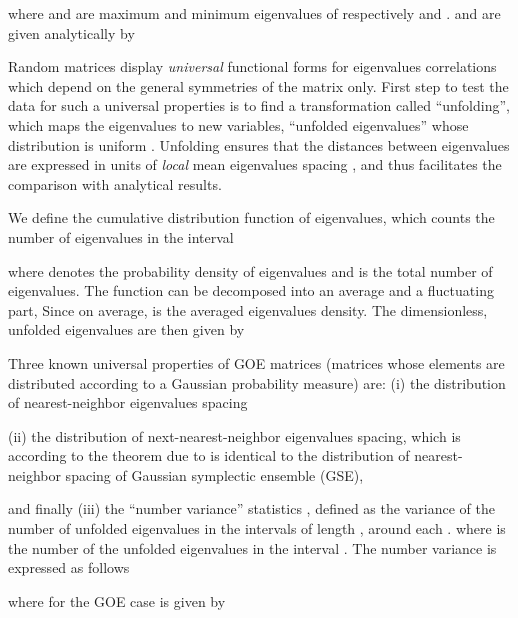 \documentclass{IEEEtran}
\begin{document}
where  and  are maximum and minimum eigenvalues
of  respectively and .
 and are given analytically by


Random matrices display \emph{universal} functional forms for eigenvalues
correlations which depend on the general symmetries of the matrix
only. First step to test the data for such a universal properties
is to find a transformation called {}``unfolding'', which maps the
eigenvalues  to new variables, {}``unfolded eigenvalues''
 whose distribution is uniform \cite{Mehta,Brody,Guhr3}.
Unfolding ensures that the distances between eigenvalues are expressed
in units of \emph{local} mean eigenvalues spacing \cite{Mehta}, and
thus facilitates the comparison with analytical results.

We define the cumulative distribution function of eigenvalues, which
counts the number of eigenvalues in the interval 


where  denotes the probability density of eigenvalues
and  is the total number of eigenvalues. The function 
can be decomposed into an average and a fluctuating part, 
Since  on
average, 
is the averaged eigenvalues density. The dimensionless, unfolded eigenvalues
are then given by 


Three known universal properties of GOE matrices (matrices whose elements
are distributed according to a Gaussian probability measure) are:
(i) the distribution of nearest-neighbor eigenvalues spacing 

(ii) the distribution of next-nearest-neighbor eigenvalues spacing,
which is according to the theorem due to \cite{Dyson2} is identical
to the distribution of nearest-neighbor spacing of Gaussian symplectic
ensemble (GSE),


and finally (iii) the {}``number variance'' statistics ,
defined as the variance of the number of unfolded eigenvalues in the
intervals of length , around each  \cite{Mehta,Guhr3,Brody}.
where  is the number of the unfolded eigenvalues
in the interval . The
number variance is expressed as follows


where  for the GOE case is given by \cite{Mehta}
\end{document}
